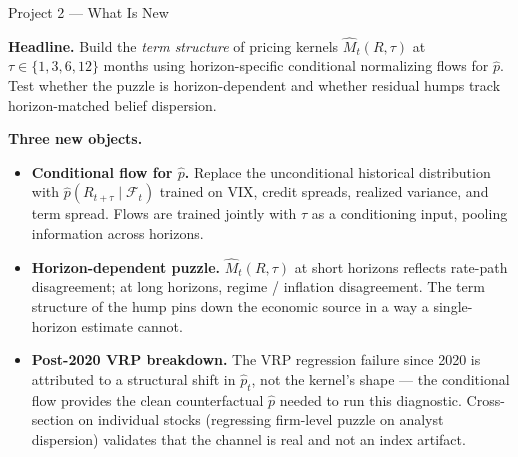 \documentclass[aspectratio=169, 11pt]{beamer}
\newcommand{\F}{\mathcal{F}}
\newenvironment{citemize}{\begin{itemize}\setlength{\itemsep}{2pt}\setlength{\parskip}{0pt}}{\end{itemize}}
\newcommand{\contribbox}[1]{%
  \begin{tcolorbox}[colback=accentgreen!10,colframe=accentgreen,boxrule=0.8pt,arc=2pt,left=4pt,right=4pt,top=2pt,bottom=2pt]
    #1\end{tcolorbox}}
\begin{document}
\begin{frame}{Project 2 --- What Is New}
\small
\contribbox{\textbf{Headline.} Build the \emph{term structure} of pricing kernels $\hat{M}_t(R,\tau)$ at $\tau \in \{1,3,6,12\}$ months using horizon-specific conditional normalizing flows for $\hat{p}$. Test whether the puzzle is horizon-dependent and whether residual humps track horizon-matched belief dispersion.}

\vspace{0.2cm}
\textbf{Three new objects.}
\begin{citemize}
  \item \textbf{Conditional flow for $\hat{p}$.} Replace the unconditional historical distribution with $\hat{p}(R_{t+\tau}\mid\F_t)$ trained on VIX, credit spreads, realized variance, and term spread. Flows are trained jointly with $\tau$ as a conditioning input, pooling information across horizons.
  \item \textbf{Horizon-dependent puzzle.} $\hat{M}_t(R,\tau)$ at short horizons reflects rate-path disagreement; at long horizons, regime / inflation disagreement. The term structure of the hump pins down the economic source in a way a single-horizon estimate cannot.
  \item \textbf{Post-2020 VRP breakdown.} The VRP regression failure since 2020 is attributed to a structural shift in $\hat{p}_t$, not the kernel's shape --- the conditional flow provides the clean counterfactual $\hat{p}$ needed to run this diagnostic. Cross-section on individual stocks (regressing firm-level puzzle on analyst dispersion) validates that the channel is real and not an index artifact.
\end{citemize}
\end{frame}
\end{document}
